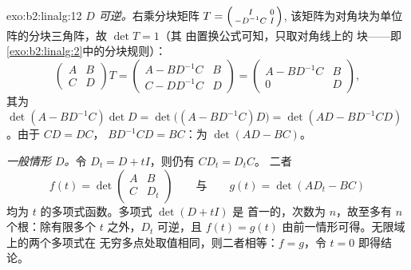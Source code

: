 \begin{solution}{exo:b2:linalg:12}
\emph{$D$ 可逆。}右乘分块矩阵
$T = \begin{psmallmatrix} I & 0\\ -D^{-1}C & I\end{psmallmatrix}$,
该矩阵为对角块为单位阵的分块三角阵，故 $\det T = 1$（其
由置换公式可知，只取对角线上的
块——即\cref{exo:b2:linalg:2}中的分块规则）：
\[
\begin{pmatrix} A & B\\ C & D\end{pmatrix} T
= \begin{pmatrix} A - BD^{-1}C & B\\ C - DD^{-1}C & D\end{pmatrix}
= \begin{pmatrix} A - BD^{-1}C & B\\ 0 & D\end{pmatrix},
\]
其为 $\det(A - BD^{-1}C)\det D = \det\bigl((A -
BD^{-1}C)D\bigr) = \det(AD - BD^{-1}CD)$。由于 $CD = DC$，
$BD^{-1}CD = BC$：为 $\det(AD - BC)$。

\emph{一般情形 $D$。}令 $D_t = D + tI$，则仍有 $CD_t = D_tC$。
二者
\[
f(t) = \det\begin{pmatrix} A & B\\ C & D_t\end{pmatrix}
\qquad\text{与}\qquad
g(t) = \det(AD_t - BC)
\]
均为 $t$ 的多项式函数。多项式 $\det(D + tI)$ 是
首一的，次数为 $n$，故至多有 $n$ 个根：除有限多个
$t$ 之外，$D_t$ 可逆，且 $f(t) = g(t)$
由前一情形可得。无限域上的两个多项式在
无穷多点处取值相同，则二者相等：$f = g$，令 $t = 0$ 即得结论。
\end{solution}

